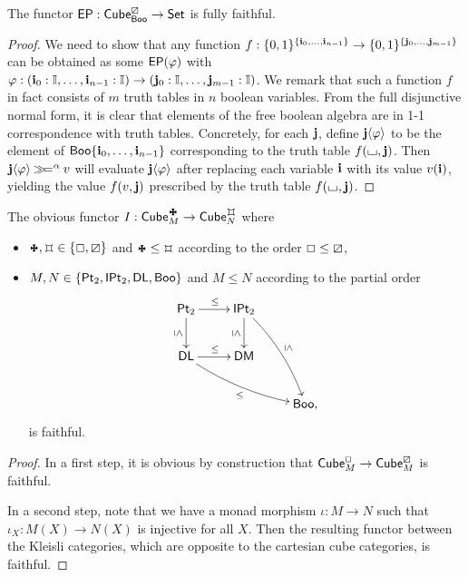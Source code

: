 \documentclass[a4paper]{memoir}
\begin{document}
\begin{proposition} \label{thm:booleanalg-ff}
	The functor $\mathsf{EP} : {\mathsf{Cube}}^\boxslash_{\mathsf{Boo}} \to {\mathsf{Set}}$ is fully faithful.
\end{proposition}
\begin{proof}
	We need to show that any function $f : \mathopen{}\left\{ 0, 1 \right\}\mathclose{}^{\mathopen{}\left\{ \mathbf{i}_0, \ldots, \mathbf{i}_{n-1} \right\}\mathclose{}} \to \mathopen{}\left\{ 0, 1 \right\}\mathclose{}^{\mathopen{}\left\{ \mathbf{j}_0, \ldots, \mathbf{j}_{m-1} \right\}\mathclose{}}$
	can be obtained as some $\mathsf{EP}(\varphi)$ with $\varphi : (\mathbf{i}_0 : {\mathbb I}, \ldots, \mathbf{i}_{n-1} : {\mathbb I}) \to (\mathbf{j}_0 : {\mathbb I}, \ldots, \mathbf{j}_{m-1} : {\mathbb I})$.
	We remark that such a function $f$ in fact consists of $m$ truth tables in $n$ boolean variables.
	From the full disjunctive normal form, it is clear that elements of the free boolean algebra are in 1-1 correspondence with truth tables.
	Concretely, for each $\mathbf{j}$, define $\mathbf{j} \langle \varphi \rangle$ to be the element of $\mathsf{Boo} \mathopen{}\left\{ \mathbf{i}_0, \ldots, \mathbf{i}_{n-1} \right\}\mathclose{}$ corresponding to the truth table $f({\llcorner\hspace{-.4ex}\lrcorner}, \mathbf{j})$.
	Then $\mathbf{j} \langle \varphi \rangle \mathbin{\gg\hspace{-.5ex}=}^\alpha v$ will evaluate $\mathbf{j} \langle \varphi \rangle$ after replacing each variable $\mathbf{i}$ with its value $v(\mathbf{i})$, yielding the value $f(v, \mathbf{j})$ prescribed by the truth table $f({\llcorner\hspace{-.4ex}\lrcorner}, \mathbf{j})$.
\end{proof}
\begin{proposition} \label{thm:monad-coercions-faithful}
	The obvious functor $I : \cubecat_M^\mycubey \to \cubecat_N^\mycubex$ where
	\begin{itemize}
		\item $\mycubey, \mycubex \in \accol{\affine, \cartes}$ and $\mycubey \leq \mycubex$ according to the order $\Box \leq \boxslash$,
		\item $M, N \in \mathopen{}\left\{ {\mathsf{Pt}_2}, {\mathsf{IPt}_2}, \mathsf{DL}, \mathsf{Boo} \right\}\mathclose{}$ and $M \leq N$ according to the partial order
		\[
			\xymatrix{
				\bipointed
					\ar[r]^\leq
					\ar[d]_{\rotatebox{270}{$\scriptstyle\leq$}}
				& \bipointedsym
					\ar[d]_{\rotatebox{270}{$\scriptstyle\leq$}}
					\ar@/^/[ddr]^{\rotatebox{270}{$\scriptstyle\leq$}}
				\\
				\distlattice
					\ar[r]^\leq
					\ar@/_/[rrd]_\leq
				& \demorgan
				\\
				&& \booleanalg,
			}
		\]
		is faithful.
	\end{itemize}
\end{proposition}
\begin{proof}
	In a first step, it is obvious by construction that ${\mathsf{Cube}}^\Box_M \to {\mathsf{Cube}}^\boxslash_M$ is faithful.
	
	In a second step, note that we have a monad morphism $\iota : M \to N$ such that $\iota_X : M(X) \to N(X)$ is injective for all $X$. Then the resulting functor between the Kleisli categories, which are opposite to the cartesian cube categories, is faithful.
\end{proof}
\end{document}
